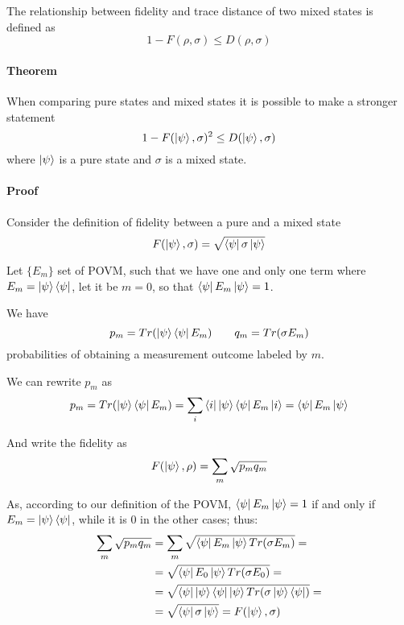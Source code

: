 \documentclass{masterthesis}
\begin{document}
The relationship between fidelity and trace distance of two mixed states is defined as
\begin{equation}
    1 - F(\rho, \sigma) \leq D(\rho, \sigma)
\end{equation}

\paragraph*{Theorem}
When comparing pure states and mixed states it is possible to make a stronger statement
\begin{equation}
    1 - F(\ket{\psi}, \sigma)^2 \leq D(\ket{\psi}, \sigma)
\end{equation}
where $\ket{\psi}$ is a pure state and $\sigma$ is a mixed state.

\paragraph*{Proof}
Consider the definition of fidelity between a pure and a mixed state
\begin{equation}
    F(\ket{\psi}, \sigma) = \sqrt{\bra{\psi}\sigma\ket{\psi}}
\end{equation}

Let $\{E_m\}$ set of POVM, such that we have one and only one term where $E_m = \ket{\psi}\bra{\psi}$, let it be $m=0$, so that $\bra{\psi}E_m\ket{\psi} = 1$. 

We have
\begin{equation}
    p_m = Tr(\ket{\psi}\bra{\psi} E_m) \quad \quad q_m = Tr(\sigma E_m)
\end{equation}
probabilities of obtaining a measurement outcome labeled by $m$.

We can rewrite $p_m$ as
\begin{equation}
    p_m = Tr(\ket{\psi}\bra{\psi} E_m) = \sum_{i} \bra{i} \ket{\psi}\bra{\psi} E_m \ket{i} = \bra{\psi}E_m\ket{\psi}
\end{equation}

And write the fidelity as
\begin{equation}
    F(\ket{\psi}, \rho) = \sum_{m} \sqrt{p_m q_m} 
\end{equation}

As, according to our definition of the POVM, $\bra{\psi}E_m\ket{\psi} = 1$ if and only if $E_m = \ket{\psi}\bra{\psi}$, while it is 0 in the other cases; thus:
\begin{align}
    \sum_{m} \sqrt{p_m q_m} &= \sum_{m} \sqrt{\bra{\psi}E_m\ket{\psi} Tr(\sigma E_m)} = \\
    &= \sqrt{\bra{\psi}E_0\ket{\psi} Tr(\sigma E_0)} = \\
    &= \sqrt{\bra{\psi}\ket{\psi}\bra{\psi}\ket{\psi} Tr(\sigma \ket{\psi}\bra{\psi})} = \\
    &= \sqrt{\bra{\psi} \sigma \ket{\psi}} = F(\ket{\psi}, \sigma)
\end{align}
\end{document}
